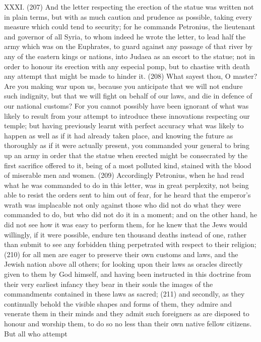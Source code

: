 XXXI. (207) And the letter respecting the erection of the statue was written not in plain terms, but
with as much caution and prudence as possible, taking every measure which could tend to
security; for he commands Petronius, the lieutenant and governor of all Syria, to whom indeed he
wrote the letter, to lead half the army which was on the Euphrates, to guard against any passage of
that river by any of the eastern kings or nations, into Judaea as an escort to the statue; not in
order to honour its erection with any especial pomp, but to chastise with death any attempt that
might be made to hinder it. (208) What sayest thou, O master? Are you making war upon us,
because you anticipate that we will not endure such indignity, but that we will fight on behalf of our
laws, and die in defence of our national customs? For you cannot possibly have been ignorant of
what was likely to result from your attempt to introduce these innovations respecting our temple; but
having previously learnt with perfect accuracy what was likely to happen as well as if it had already
taken place, and knowing the future as thoroughly as if it were actually present, you commanded
your general to bring up an army in order that the statue when erected might be consecrated by the
first sacrifice offered to it, being of a most polluted kind, stained with the blood of miserable men
and women. (209) Accordingly Petronius, when he had read what he was commanded to do in this
letter, was in great perplexity, not being able to resist the orders sent to him out of fear, for he
heard that the emperor's wrath was implacable not only against those who did not do what they
were commanded to do, but who did not do it in a moment; and on the other hand, he did not see
how it was easy to perform them, for he knew that the Jews would willingly, if it were possible,
endure ten thousand deaths instead of one, rather than submit to see any forbidden thing
perpetrated with respect to their religion; (210) for all men are eager to preserve their own
customs and laws, and the Jewish nation above all others; for looking upon their laws as oracles
directly given to them by God himself, and having been instructed in this doctrine from their very
earliest infancy they bear in their souls the images of the commandments contained in these laws
as sacred; (211) and secondly, as they continually behold the visible shapes and forms of them,
they admire and venerate them in their minds and they admit such foreigners as are disposed to
honour and worship them, to do so no less than their own native fellow citizens. But all who attempt
